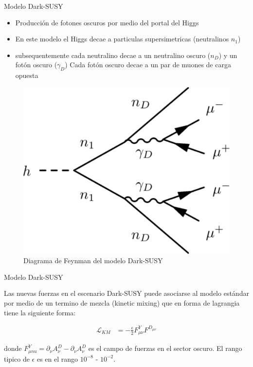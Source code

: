 \begin{frame}{Modelo Dark-SUSY}

\begin{itemize}
    \item Producci\'on de fotones oscuros por medio del portal del Higgs 
    \item En este modelo el Higgs decae a particulas supersimetricas (neutralinos $n_{1}$)
    \item subsequentemente cada neutralino decae a un neutralino oscuro ($n_{D}$) y un fot\'on oscuro ($\gamma_{D}$)
    \tiem Cada fot\'on oscuro decae a un par de muones de carga opuesta
\end{itemize}

\begin{figure}
    \centering
    \includegraphics[scale=0.3]{Imag/figures_diagrams_h_to_2n1_to_2nD2gD_to_2nD4mu.pdf}
    \caption{Diagrama de Feynman del modelo Dark-SUSY}
    \label{fig:my_label}
\end{figure}

\end{frame}


\begin{frame}{Modelo Dark-SUSY}
    
    Las nuevas fuerzas en el escenario Dark-SUSY puede asociarse al modelo est\'andar por medio de un termino de mezcla (kinetic mixing) que en forma de lagrangia tiene la siguiente forma: 
    
    \begin{align*}
       \mathcal{L}_{KM} &= - \frac{\epsilon}{2} F^{Y}_{\mu \nu} F^{D_{\mu \nu}} 
    \end{align*} 

donde $F^{Y}_{\mu nu} = \partial_{\nu}A_{\nu}^{D} - \partial_{\nu}A_{\nu}^{D}$ es el campo de fuerzas en el sector oscuro. El rango tipico de $\epsilon$ es en el rango $10^{-8}$ - $10^{-2}$.
    
\end{frame}


